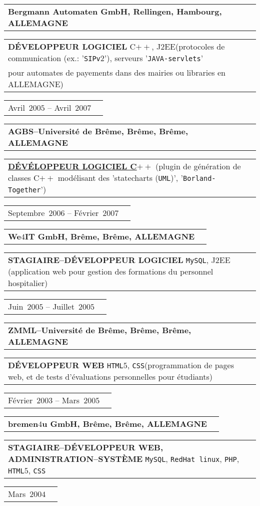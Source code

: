 \documentclass[9pt,a4paper]{article} %
\makeatletter
\newcommand{\headerrow}[2]
{\begin{tabular*}{\linewidth}{l@{\extracolsep{\fill}}r}
	#1 &
	#2 \\
\end{tabular*}}
\newcommand{\headerrowONE}[1]{\headerrow{#1}{}}
\newcommand{\cplusplus}{C$++$\xspace}
\newcommand{\css}{\texttt{CSS}\xspace}
\newcommand{\html}{\texttt{HTML$5$}\xspace}
\newcommand{\jtwoee}{J$2$EE\xspace}
\newcommand{\php}{\texttt{PHP}\xspace}
\newcommand{\mysql}{\texttt{MySQL}\xspace}
\newcommand{\redhat}{\texttt{RedHat~linux}\xspace}
\newcommand{\cvitemdate}[2]{#1~$#2$\xspace}
\newcommand{\cvitempositionheld}[1]{\textbf{#1}\xspace}
\makeatother
\begin{document}
\vspace{0.3em}

\headerrowONE{\textbf{Bergmann Automaten GmbH, Rellingen, Hambourg, ALLEMAGNE}}	
\headerrowONE{\cvitempositionheld{DÉVELOPPEUR LOGICIEL} \cplusplus, \jtwoee (protocoles de
communication (ex.: '\texttt{SIPv$2$}'), serveurs '\texttt{JAVA-servlets}'\\
 pour automates de payements dans des mairies ou libraries en ALLEMAGNE)}
\headerrowONE{\cvitemdate{Avril}{2005} -- \cvitemdate{Avril}{2007}}	
	
\vspace{0.3em}

\headerrowONE{\textbf{AGBS--Université de Brême, Brême, Brême, ALLEMAGNE}}	
\headerrowONE{\href{http://www.informatik.uni-bremen.de/agbs/jp/papers/peleska_et_al_soqua2006.pdf}
	{\cvitempositionheld{DÉVÉLOPPEUR LOGICIEL \cplusplus}} (plugin de 
génération de classes \cplusplus modélisant des 'statecharts (\texttt{UML})', '\texttt{Borland-Together}')}
\headerrowONE{\cvitemdate{Septembre}{2006} -- \cvitemdate{Février}{2007}}	

\vspace{0.3em}

\headerrowONE{\textbf{We$4$IT GmbH, Brême, Brême, ALLEMAGNE}}	
\headerrowONE{\cvitempositionheld{STAGIAIRE--DÉVELOPPEUR LOGICIEL} \mysql, \jtwoee
(application web pour gestion des formations du personnel hospitalier)}
\headerrowONE{\cvitemdate{Juin}{2005} -- \cvitemdate{Juillet}{2005}}
	
\vspace{0.3em}

\headerrowONE{\textbf{ZMML--Université de Brême, Brême, Brême, ALLEMAGNE}}	
\headerrowONE{\cvitempositionheld{DÉVELOPPEUR WEB} \html, \css (programmation de pages web,
et de tests d'évaluations personnelles pour étudiants)}
\headerrowONE{\cvitemdate{Février}{2003} -- \cvitemdate{Mars}{2005}}	

\vspace{0.3em}

\headerrowONE{\textbf{bremen$4$u GmbH, Brême, Brême, ALLEMAGNE}}	
\headerrowONE{\cvitempositionheld{STAGIAIRE--DÉVELOPPEUR WEB, ADMINISTRATION--SYSTÈME} \mysql, \redhat, \php,
\html, \css}
\headerrowONE{\cvitemdate{Mars}{2004}}	

\vspace{2em}

\newpage

\end{document}
